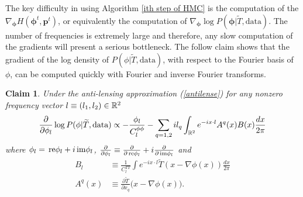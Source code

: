\documentclass[iop,revtex4,apj,onecolumn]{emulateapj}
\newtheorem{claim}{Claim}
\newcommand{\re}{\text{\,\rm re}}
\newcommand{\im}{\text{\,\rm im}}
\newcommand{\bs}{\boldsymbol}
\begin{document}
The key difficulty in using Algorithm \ref{ith step of HMC} is the computation of the $\nabla_{\bs \phi} H(\bs \phi^t, \bs p^t)$, or equivalently the computation of $\nabla_{\bs \phi} \log P(\bs \phi|\widetilde T, \text{data})$. The number of frequencies is extremely large and therefore, any slow computation of the gradients will present a serious bottleneck. 
The follow claim shows that the gradient of the log density of $P(\phi|\widetilde T, \text{data})$, with respect to the Fourier basis of $\phi$, can be computed quickly with Fourier and inverse Fourier transforms. 

\begin{claim}
\label{grad claim}
 Under the anti-lensing approximation (\ref{antilense}) for any nonzero frequency vector $l\equiv (l_1, l_2) \in \Bbb R^2$ 
\begin{equation}
\label{grad claim eq}
 \frac{\partial}{\partial \phi_l}\log P(\phi | \widetilde T,  \text{\rm data}) \propto -  \frac{\phi_l}{C^{\phi\phi}_{l}} -  \sum_{q=1,2} i  l_q \int_{\Bbb R^2} e^{-i x\cdot l} A^q(x)B(x) \frac{dx}{2\pi}  
\end{equation}
 where  $\phi_l = \re \phi_l + i \im \phi_l$, $\frac{\partial}{\partial \phi_l}\equiv \frac{\partial}{\partial\re \phi_l} + i \frac{\partial}{\partial\im\phi_l}$ and 
 \begin{align}
 B_l &\equiv \frac{1}{C_l^{TT}} \int e^{-i x\cdot l}  \widetilde T(x-\nabla \phi(x))\frac{dx}{2\pi} \\ 
 A^q(x) &\equiv \frac{\partial\widetilde T}{\partial x_q}\bigl(x-\nabla \phi(x)\bigr).
 \end{align}
\end{claim}
\end{document}
